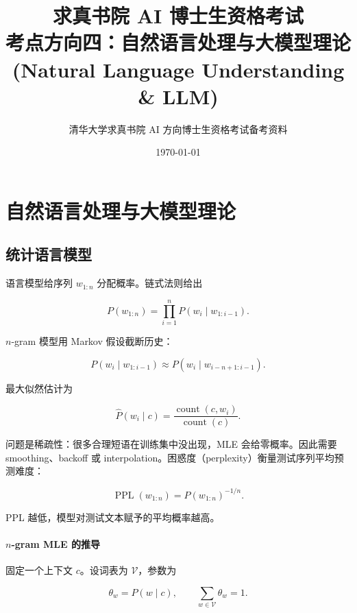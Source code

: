 \documentclass[11pt]{ctexart}
\title{\bfseries 求真书院 AI 博士生资格考试\\考点方向四：自然语言处理与大模型理论 (Natural Language Understanding \& LLM)}
\author{清华大学求真书院 AI 方向博士生资格考试备考资料}
\date{\today}
\begin{document}
\maketitle
\tableofcontents

\label{sec:nlu}
\section{自然语言处理与大模型理论}


\subsection{统计语言模型}


\begin{definition}
语言模型给序列 \(w_{1:n}\) 分配概率。链式法则给出

\[
  P(w_{1:n})
  =
  \prod_{i=1}^{n}P(w_i\mid w_{1:i-1}).
\]

\(n\)-gram 模型用 Markov 假设截断历史：

\[
  P(w_i\mid w_{1:i-1})
  \approx
  P(w_i\mid w_{i-n+1:i-1}).
\]
\end{definition}

最大似然估计为

\[
  \widehat P(w_i\mid c)
  =
  \frac{\operatorname{count}(c,w_i)}
  {\operatorname{count}(c)}.
\]

问题是稀疏性：很多合理短语在训练集中没出现，MLE 会给零概率。因此需要 smoothing、backoff 或 interpolation。困惑度（perplexity）衡量测试序列平均预测难度：

\[
  \operatorname{PPL}(w_{1:n})
  =
  P(w_{1:n})^{-1/n}.
\]

PPL 越低，模型对测试文本赋予的平均概率越高。

\paragraph{\(n\)-gram MLE 的推导}

固定一个上下文 \(c\)。设词表为 \(\mathcal{V}\)，参数为

\[
  \theta_w=P(w\mid c),
  \qquad
  \sum_{w\in\mathcal{V}}\theta_w=1.
\]
\end{document}
